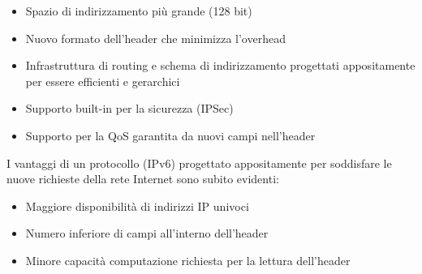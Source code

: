 \begin{itemize}
	\item Spazio di indirizzamento più grande (128 bit)
	\item Nuovo formato dell'header che minimizza l'overhead
	\item Infrastruttura di routing e schema di indirizzamento progettati appositamente per essere efficienti e gerarchici
	\item Supporto built-in per la sicurezza (IPSec) \cite{famous:paper_ipsec}
	\item Supporto per la QoS garantita da nuovi campi nell'header
\end{itemize}
I vantaggi di un protocollo (IPv6) progettato appositamente per soddisfare le nuove richieste della rete Internet sono subito evidenti:
\begin{itemize}
	\item[\checkmark] Maggiore disponibilità di indirizzi IP univoci
	\item[\checkmark] Numero inferiore di campi all'interno dell'header
	\item[\checkmark] Minore capacità computazione richiesta per la lettura dell'header
\end{itemize}

